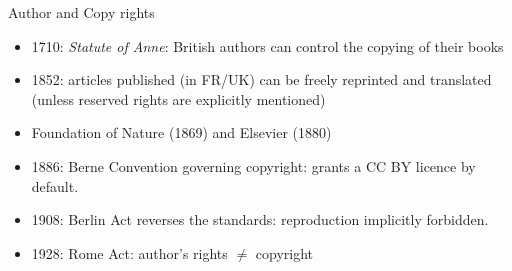 \documentclass[10pt,compress,serif,aspectratio=169]{beamer}
\begin{document}
\begin{frame}[t]{Author and Copy rights}
\begin{itemize}

 \item 1710: \textit{Statute of Anne}: British authors can control the copying of their books 
 \item 1852: articles published (in FR/UK) can be freely reprinted and translated (unless reserved rights are explicitly mentioned)
 \item Foundation of Nature (1869) and Elsevier (1880)
 \item 1886: Berne Convention governing copyright: grants a CC BY licence by default.%

 \item 1908: Berlin Act reverses the standards: reproduction implicitly forbidden. %
 \item 1928: Rome Act: author’s rights $\neq$ copyright
 \end{itemize}
\end{frame}
\end{document}
